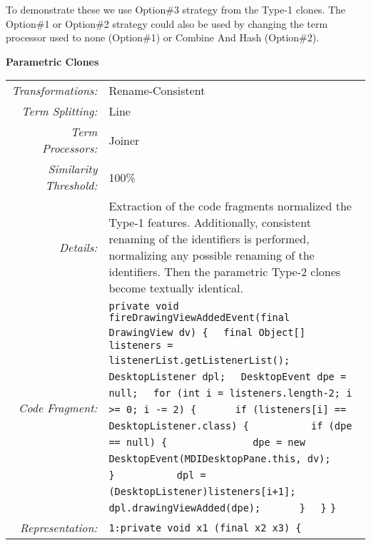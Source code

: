 \documentclass[]{article}
\begin{document}
	To demonstrate these we use Option\#3 strategy from the Type-1 clones.  The Option\#1 or Option\#2 strategy could also be used by changing the term processor used to none (Option\#1) or Combine And Hash (Option\#2).
	
	\noindent\begin{minipage}{\textwidth}
	\noindent \textbf{Parametric Clones}\\
	\begin{tabular}{rp{12.5cm}}
		\bottomrule[2pt]
		\textit{Transformations:} & Rename-Consistent \\
		\textit{Term Splitting:}  & Line\\
		\textit{Term Processors:} & Joiner \\
		\textit{Similarity Threshold:} & 100\% \\
		\midrule
		\textit{Details:}         & Extraction of the code fragments normalized the Type-1 features.  Additionally, consistent renaming of the identifiers is performed, normalizing any possible renaming of the identifiers.  Then the parametric Type-2 clones become textually identical.\\
		\midrule
		\textit{Code Fragment:} &
		\verb|private void fireDrawingViewAddedEvent(final DrawingView dv) {|\newline
		\verb|	final Object[] listeners = listenerList.getListenerList();|\newline
		\verb|	DesktopListener dpl;|\newline
		\verb|	DesktopEvent dpe = null;|\newline
		\verb|	for (int i = listeners.length-2; i >= 0; i -= 2) {|\newline
		\verb|		if (listeners[i] == DesktopListener.class) {|\newline
		\verb|			if (dpe == null) {|\newline
		\verb|				dpe = new DesktopEvent(MDIDesktopPane.this, dv);|\newline
		\verb|			}|\newline
		\verb|			dpl = (DesktopListener)listeners[i+1];|\newline
		\verb|			dpl.drawingViewAdded(dpe);|\newline
		\verb|		}|\newline
		\verb|	}|\newline
		\verb|}|\newline
		\\
		\textit{Representation:} & 
		\verb|1:private void x1 (final x2 x3) {|\newline

\end{tabular}
\end{minipage}
\end{document}
